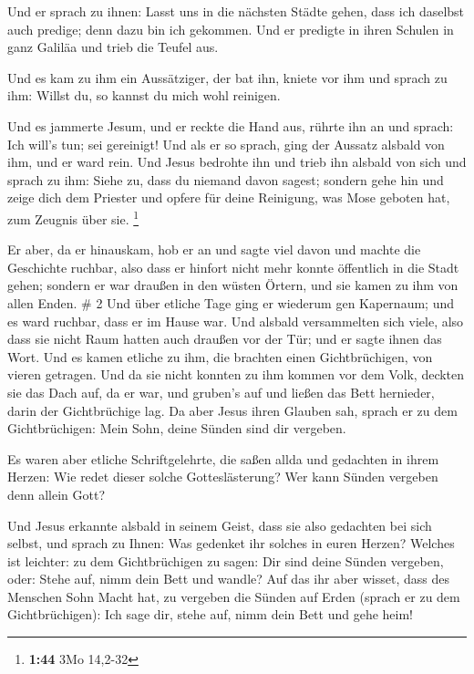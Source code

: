  Und er sprach zu ihnen: Lasst uns in die nächsten Städte
gehen, dass ich daselbst auch predige; denn dazu bin ich gekommen.
 Und er predigte in ihren Schulen in ganz Galiläa und
trieb die Teufel aus.

 Und es kam zu ihm ein Aussätziger, der bat ihn, kniete
vor ihm und sprach zu ihm: Willst du, so kannst du mich wohl reinigen.

 Und es jammerte Jesum, und er reckte die Hand aus,
rührte ihn an und sprach: Ich will's tun; sei gereinigt! 
Und als er so sprach, ging der Aussatz alsbald von ihm, und er ward
rein.  Und Jesus bedrohte ihn und trieb ihn alsbald von
sich  und sprach zu ihm: Siehe zu, dass du niemand davon
sagest; sondern gehe hin und zeige dich dem Priester und opfere für
deine Reinigung, was Mose geboten hat, zum Zeugnis über sie. \footnote{\textbf{1:44}
  3Mo 14,2-32}

 Er aber, da er hinauskam, hob er an und sagte viel davon
und machte die Geschichte ruchbar, also dass er hinfort nicht mehr
konnte öffentlich in die Stadt gehen; sondern er war draußen in den
wüsten Örtern, und sie kamen zu ihm von allen Enden. \# 2 
Und über etliche Tage ging er wiederum gen Kapernaum; und es ward
ruchbar, dass er im Hause war.  Und alsbald versammelten
sich viele, also dass sie nicht Raum hatten auch draußen vor der Tür;
und er sagte ihnen das Wort.  Und es kamen etliche zu ihm,
die brachten einen Gichtbrüchigen, von vieren getragen. 
Und da sie nicht konnten zu ihm kommen vor dem Volk, deckten sie das
Dach auf, da er war, und gruben's auf und ließen das Bett hernieder,
darin der Gichtbrüchige lag.  Da aber Jesus ihren Glauben
sah, sprach er zu dem Gichtbrüchigen: Mein Sohn, deine Sünden sind dir
vergeben.

 Es waren aber etliche Schriftgelehrte, die saßen allda
und gedachten in ihrem Herzen:  Wie redet dieser solche
Gotteslästerung? Wer kann Sünden vergeben denn allein Gott?

 Und Jesus erkannte alsbald in seinem Geist, dass sie also
gedachten bei sich selbst, und sprach zu Ihnen: Was gedenket ihr solches
in euren Herzen?  Welches ist leichter: zu dem
Gichtbrüchigen zu sagen: Dir sind deine Sünden vergeben, oder: Stehe
auf, nimm dein Bett und wandle?  Auf das ihr aber wisset,
dass des Menschen Sohn Macht hat, zu vergeben die Sünden auf Erden
(sprach er zu dem Gichtbrüchigen):  Ich sage dir, stehe
auf, nimm dein Bett und gehe heim!

